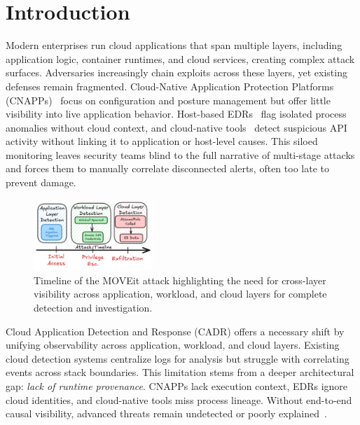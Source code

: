 \section*{Introduction}

Modern enterprises run cloud applications that span multiple layers, including application logic, container runtimes, and cloud services, creating complex attack surfaces. Adversaries increasingly chain exploits across these layers, yet existing defenses remain fragmented. Cloud-Native Application Protection Platforms (CNAPPs)~\cite{wiz_cdr,orca_cnapp} focus on configuration and posture management but offer little visibility into live application behavior. Host-based EDRs~\cite{crowdstrike} flag isolated process anomalies without cloud context, and cloud-native tools~\cite{aws_guardduty,aws_cdr,paloalto_cdr} detect suspicious API activity without linking it to application or host-level causes. This siloed monitoring leaves security teams blind to the full narrative of multi-stage attacks and forces them to manually correlate disconnected alerts, often too late to prevent damage.

\begin{figure}
    \centering \includegraphics[width=0.40\textwidth]{fig/moveit.png}
    \caption{Timeline of the MOVEit attack highlighting the need for cross-layer visibility across application, workload, and cloud layers for complete detection and investigation.}
    \label{fig:example:moveit}
    \vspace{-2ex}
\end{figure}

Cloud Application Detection and Response (CADR) offers a necessary shift by unifying observability across application, workload, and cloud layers. Existing cloud detection systems centralize logs for analysis but struggle with correlating events across stack boundaries. This limitation stems from a deeper architectural gap: {\it lack of runtime provenance}. CNAPPs lack execution context, EDRs ignore cloud identities, and cloud-native tools miss process lineage. Without end-to-end causal visibility, advanced threats remain undetected or poorly explained~\cite{omegalog,dossier}.



